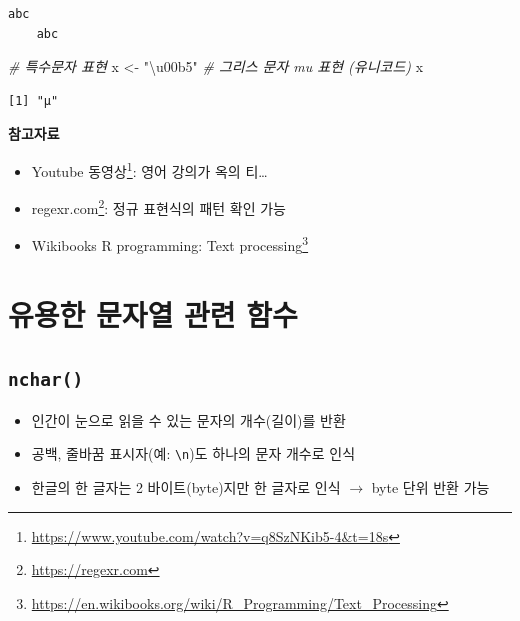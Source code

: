 \documentclass[
  11pt,
]{krantz}
\makeatletter
\newenvironment{Shaded}{\begin{snugshade}}{\end{snugshade}}
\newcommand{\CommentTok}[1]{\textcolor[rgb]{0.37,0.37,0.37}{\textit{#1}}}
\newcommand{\NormalTok}[1]{#1}
\newcommand{\OtherTok}[1]{\textcolor[rgb]{0.37,0.37,0.37}{#1}}
\newcommand{\StringTok}[1]{\textcolor[rgb]{0.5,0.5,0.5}{#1}}
\providecommand{\tightlist}{%
  \setlength{\itemsep}{0pt}\setlength{\parskip}{0pt}}
\renewcommand{\href}[2]{#2\footnote{\url{#1}}}
\newenvironment{kframe}{%
\medskip{}
\setlength{\fboxsep}{.8em}
 \def\at@end@of@kframe{}%
 \ifinner\ifhmode%
  \def\at@end@of@kframe{\end{minipage}}%
  \begin{minipage}{\columnwidth}%
 \fi\fi%
 \def\FrameCommand##1{\hskip\@totalleftmargin \hskip-\fboxsep
 \colorbox{shadecolor}{##1}\hskip-\fboxsep
     \hskip-\linewidth \hskip-\@totalleftmargin \hskip\columnwidth}%
 \MakeFramed {\advance\hsize-\width
   \@totalleftmargin\z@ \linewidth\hsize
   \@setminipage}}%
 {\par\unskip\endMakeFramed%
 \at@end@of@kframe}
\newenvironment{rmdblock}[1]
  {
  \begin{itemize}
  \renewcommand{\labelitemi}{
    \raisebox{-.7\height}[0pt][0pt]{
      {\setkeys{Gin}{width=3em,keepaspectratio}\texttt{[image: images/\#1]}}
    }
  }
  \setlength{\fboxsep}{1em}
  \begin{kframe}
  \item
  }
  {
  \end{kframe}
  \end{itemize}
  }
\newenvironment{rmdtip}
  {\begin{rmdblock}{tip}}
  {\end{rmdblock}}
\makeatother
\begin{document}
\begin{verbatim}
abc
    abc
\end{verbatim}

\begin{Shaded}
\begin{Highlighting}[]
\CommentTok{\# 특수문자 표현}
\NormalTok{x }\OtherTok{\textless{}{-}} \StringTok{"\textbackslash{}u00b5"} \CommentTok{\# 그리스 문자 mu 표현 (유니코드)}
\NormalTok{x}
\end{Highlighting}
\end{Shaded}

\begin{verbatim}
[1] "µ"
\end{verbatim}

\normalsize

\footnotesize

\begin{rmdtip}
\textbf{참고자료}

\begin{itemize}
\tightlist
\item
  \href{https://www.youtube.com/watch?v=q8SzNKib5-4\&t=18s}{Youtube 동영상}: 영어 강의가 옥의 티\ldots{}
\item
  \href{https://regexr.com}{regexr.com}: 정규 표현식의 패턴 확인 가능
\item
  \href{https://en.wikibooks.org/wiki/R_Programming/Text_Processing}{Wikibooks R programming: Text processing}
\end{itemize}
\end{rmdtip}

\normalsize

\hypertarget{uxc720uxc6a9uxd55c-uxbb38uxc790uxc5f4-uxad00uxb828-uxd568uxc218}{%
\section{유용한 문자열 관련 함수}\label{uxc720uxc6a9uxd55c-uxbb38uxc790uxc5f4-uxad00uxb828-uxd568uxc218}}

\hypertarget{nchar}{%
\subsection{\texorpdfstring{\textbf{\texttt{nchar()}}}{nchar()}}\label{nchar}}

\begin{itemize}
\tightlist
\item
  인간이 눈으로 읽을 수 있는 문자의 개수(길이)를 반환
\item
  공백, 줄바꿈 표시자(예: \texttt{\textbackslash{}n})도 하나의 문자 개수로 인식
\item
  한글의 한 글자는 2 바이트(byte)지만 한 글자로 인식 \(\rightarrow\) byte 단위 반환 가능
\end{itemize}
\end{document}
